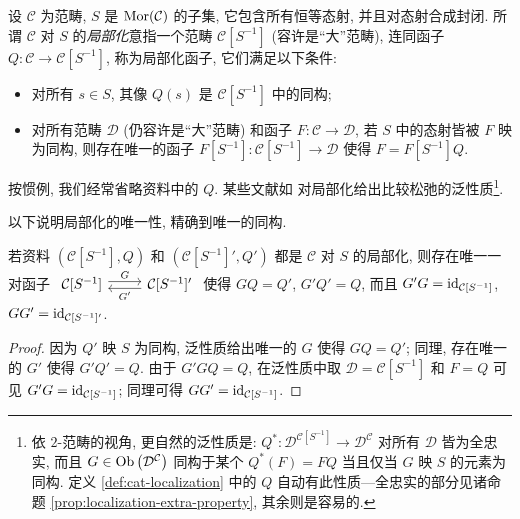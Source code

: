\begin{definition}\label{def:cat-localization}
	设 $\mathcal{C}$ 为范畴, $S$ 是 $\operatorname{Mor}(\mathcal{C})$ 的子集, 它包含所有恒等态射, 并且对态射合成封闭. 所谓 $\mathcal{C}$ 对 $S$ 的\emph{局部化}意指一个范畴 $\mathcal{C}[S^{-1}]$ (容许是``大''范畴), 连同函子 $Q: \mathcal{C} \to \mathcal{C}[S^{-1}]$, 称为局部化函子, 它们满足以下条件:
	\begin{itemize}
		\item 对所有 $s \in S$, 其像 $Q(s)$ 是 $\mathcal{C}[S^{-1}]$ 中的同构;
		\item 对所有范畴 $\mathcal{D}$ (仍容许是``大''范畴) 和函子 $F: \mathcal{C} \to \mathcal{D}$, 若 $S$ 中的态射皆被 $F$ 映为同构, 则存在唯一的函子 $F[S^{-1}]: \mathcal{C}[S^{-1}] \to \mathcal{D}$ 使得 $F = F[S^{-1}] Q$.
	\end{itemize}
\end{definition}

按惯例, 我们经常省略资料中的 $Q$. 某些文献如 \cite[Definition 7.1.1]{KS06} 对局部化给出比较松弛的泛性质\footnote{依 $2$-范畴的视角, 更自然的泛性质是: $Q^*: \mathcal{D}^{\mathcal{C}[S^{-1}]} \to \mathcal{D}^{\mathcal{C}}$ 对所有 $\mathcal{D}$ 皆为全忠实, 而且 $G \in \operatorname{Ob}\left(\mathcal{D}^{\mathcal{C}}\right)$ 同构于某个 $Q^*(F) = FQ$ 当且仅当 $G$ 映 $S$ 的元素为同构. 定义 \ref{def:cat-localization} 中的 $Q$ 自动有此性质---全忠实的部分见诸命题 \ref{prop:localization-extra-property}, 其余则是容易的.}.

以下说明局部化的唯一性, 精确到唯一的同构.
\begin{proposition}\label{prop:cat-localization-unique}
	若资料 $(\mathcal{C}[S^{-1}], Q)$ 和 $(\mathcal{C}[S^{-1}]', Q')$ 都是 $\mathcal{C}$ 对 $S$ 的局部化, 则存在唯一一对函子
	$\begin{tikzcd}
		\mathcal{C}[S^{-1}] \arrow[r, shift left, "G"] & \mathcal{C}[S^{-1}]' \arrow[l, shift left, "{G'}"]
	\end{tikzcd}$
	使得 $GQ = Q'$, $G'Q' = Q$, 而且 $G'G = \mathrm{id}_{\mathcal{C}[S^{-1}]}$, $GG' = \mathrm{id}_{\mathcal{C}[S^{-1}]'}$.
\end{proposition}
\begin{proof}
	因为 $Q'$ 映 $S$ 为同构, 泛性质给出唯一的 $G$ 使得 $GQ = Q'$; 同理, 存在唯一的 $G'$ 使得 $G' Q' = Q$. 由于 $G' GQ = Q$, 在泛性质中取 $\mathcal{D} = \mathcal{C}[S^{-1}]$ 和 $F = Q$ 可见 $G'G = \mathrm{id}_{\mathcal{C}[S^{-1}]}$; 同理可得 $GG' = \mathrm{id}_{\mathcal{C}[S^{-1}]}$.
\end{proof}

